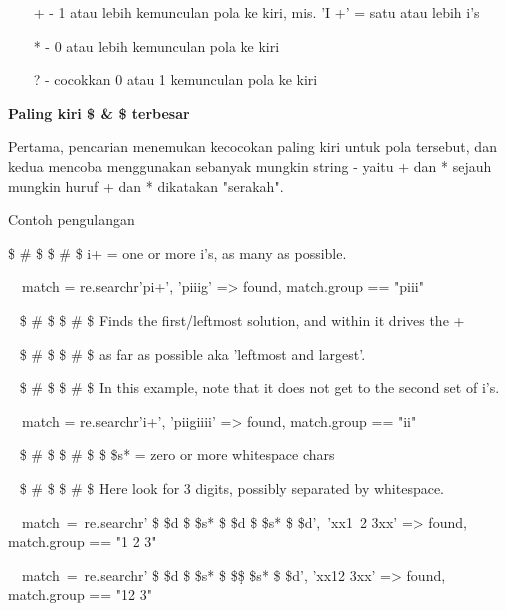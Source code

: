 \begin{12pt}
\begin{12pt}
\begin{12pt}
\begin{12pt}
\begin{12pt}
\begin{12pt}
\vspace{12pt}
\noindent 
~~~ + - 1 atau lebih kemunculan pola ke kiri, mis. 'I +' = satu atau lebih i's \par
\noindent 
~~~ * - 0 atau lebih kemunculan pola ke kiri \par
\noindent 
~~~ ? - cocokkan 0 atau 1 kemunculan pola ke kiri \par
\vspace{12pt}
\vspace{14pt}
\noindent 
{\fontsize{14pt}{14pt}\selectfont \textbf{Paling kiri  \$  \&  \$ terbesar} \\} \par
Pertama, pencarian menemukan kecocokan paling kiri untuk pola tersebut, dan kedua mencoba menggunakan sebanyak mungkin string - yaitu + dan * sejauh mungkin {huruf + dan * dikatakan "serakah"}. \par
\noindent 
Contoh pengulangan \par
\begin{12pt}
\noindent 
 \$  \#  \$ \$  \#  \$ i+ = one or more i's, as many as possible. \par
\noindent 
~~match = re.search{r'pi+', 'piiig'} =>  found, match.group{} == "piii" \par
\begin{12pt}
\noindent 
~  \$  \#  \$ \$  \#  \$ Finds the first/leftmost solution, and within it drives the + \par
\noindent 
~  \$  \#  \$ \$  \#  \$ as far as possible {aka 'leftmost and largest'}. \par
\noindent 
~  \$  \#  \$ \$  \#  \$ In this example, note that it does not get to the second set of i's. \par
\noindent 
~~match = re.search{r'i+', 'piigiiii'} =>  found, match.group{} == "ii" \par
\begin{12pt}
\noindent 
~  \$  \#  \$ \$  \#  \$  \$  \setminus  \$s* = zero or more whitespace chars \par
\noindent 
~  \$  \#  \$ \$  \#  \$ Here look for 3 digits, possibly separated by whitespace. \par
\noindent 
~~match~=~re.search{r' \$  \setminus  \$d \$  \setminus  \$s* \$  \setminus  \$d \$  \setminus  \$s* \$  \setminus  \$d',~'xx1~2   3xx'} =>  found, match.group{} == "1 2   3" \par
\noindent 
~~match~=~re.search{r' \$  \setminus  \$d \$  \setminus  \$s* \$  \setminus  \$\d \$  \setminus  \$s* \$  \setminus  \$d', 'xx12  3xx'} =>  found, match.group{} == "12  3" \par

\end{12pt}
\end{12pt}
\end{12pt}
\end{12pt}
\end{12pt}
\end{12pt}
\end{12pt}
\end{12pt}
\end{12pt}
